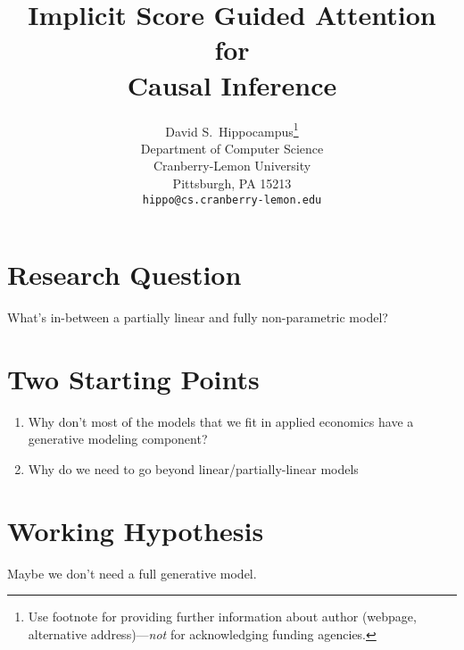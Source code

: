 \documentclass{article}
\title{Implicit Score Guided Attention for \\ Causal Inference}
\author{%
  David S.~Hippocampus\thanks{Use footnote for providing further information
    about author (webpage, alternative address)---\emph{not} for acknowledging
    funding agencies.} \\
  Department of Computer Science\\
  Cranberry-Lemon University\\
  Pittsburgh, PA 15213 \\
  \texttt{hippo@cs.cranberry-lemon.edu} \\
}
\begin{document}
\maketitle


 


\section{Research Question}
What's in-between a partially linear and fully non-parametric model?


\section{Two Starting Points}
\begin{enumerate}
    \item Why don't most of the models that we fit in applied economics have a generative modeling component? 
    \item Why do we need to go beyond linear/partially-linear models
\end{enumerate}


\section{Working Hypothesis}
Maybe we don't need a full generative model.
\end{document}
